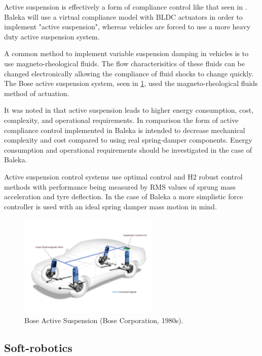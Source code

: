 Active suspension is effectively a form of compliance control like that seen in \cite{Pratt2001}. Baleka will use a virtual compliance model with BLDC actuators in order to implement "active suspension", whereas vehicles are forced to use a more heavy duty active suspension system. 

A common method to implement variable suspension damping in vehicles is to use magneto-rheological fluids. The flow characterisitics of these fluids can be changed electronically allowing the compliance of fluid shocks to change quickly.\cite{Tseng2015} The Bose active suspension system, seen in \cref{fig:Bose Active Suspension}, used the magneto-rheological fluids method of actuation.

It was noted in \cite{Tseng2015} that active suspension leads to higher energy consumption, cost, complexity, and operational requirements. In comparison the form of active compliance control implemented in Baleka is intended to decrease mechanical complexity and cost compared to using real spring-damper components. Energy consumption and operational requirements should be investigated in the case of Baleka.

Active suspension control systems use optimal control and H2 robust control methods with performance being measured by RMS values of sprung mass acceleration and tyre deflection.\cite{Tseng2015} In the case of Baleka a more simplistic force controller is used with an ideal spring damper mass motion in mind.

\begin{figure}
\centering
\includegraphics[width=0.6\textwidth]{images/literature/Bose-suspension-system.jpg} 
\caption{Bose Active Suspension (Bose Corporation, 1980s)\cite{Bose}.}
\label{fig:Bose Active Suspension}
\end{figure}


\subsection{Soft-robotics}

